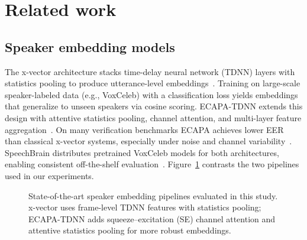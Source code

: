 \documentclass[cameraready]{Interspeech}
\begin{document}
\section{Related work}
\label{sec:related}

\subsection{Speaker embedding models}

The x-vector architecture stacks time-delay neural network (TDNN) layers with statistics pooling to produce utterance-level embeddings~\cite{snyder2018xvector}. Training on large-scale speaker-labeled data (e.g., VoxCeleb) with a classification loss yields embeddings that generalize to unseen speakers via cosine scoring. ECAPA-TDNN extends this design with attentive statistics pooling, channel attention, and multi-layer feature aggregation~\cite{desplanques2020ecapa}. On many verification benchmarks ECAPA achieves lower EER than classical x-vector systems, especially under noise and channel variability~\cite{desplanques2020ecapa}. SpeechBrain distributes pretrained VoxCeleb models for both architectures, enabling consistent off-the-shelf evaluation~\cite{ravanelli2021speechbrain,chung2018voxceleb}. Figure~\ref{fig:sota} contrasts the two pipelines used in our experiments.

\begin{figure}[t]
  \centering
  \caption{State-of-the-art speaker embedding pipelines evaluated in this study. x-vector uses frame-level TDNN features with statistics pooling; ECAPA-TDNN adds squeeze--excitation (SE) channel attention and attentive statistics pooling for more robust embeddings.}
  \label{fig:sota}
\end{figure}
\end{document}

